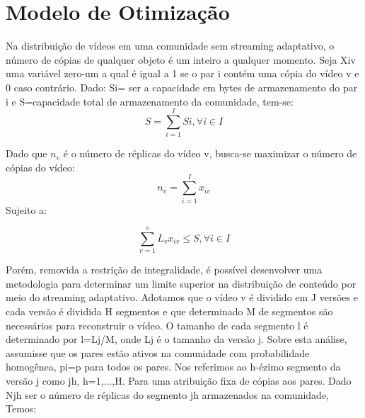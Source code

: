 \documentclass[
	12pt,				%
	oneside,			%
	a4paper,			%
	english,			%
	brazil				%
	]{abntex2ppgsi}
\begin{document}
\section{Modelo de Otimização}

Na distribuição de vídeos em uma comunidade sem streaming adaptativo, o número de cópias de qualquer objeto é um inteiro a qualquer momento. Seja Xiv uma variável zero-um a qual é igual a 1 se o par i contém uma cópia do vídeo v e 0 caso contrário.
Dado: Si= ser a capacidade em bytes de armazenamento do par i e  S=capacidade total de armazenamento da comunidade, tem-se:
\begin{equation}
S=\sum_{i=1}^{I}Si,\forall i\in I
\end{equation}





Dado que $n_v$ é o número de réplicas do vídeo v, busca-se maximizar o número de cópias do vídeo:
\begin{equation}
n_{v}=\sum_{i=1}^{I}x_{iv}
	\label{eq:equacao-exemplo1}
\end{equation}
Sujeito a:

\begin{equation}
  \sum_{v=1}^{v}L_{v}x_{iv}\leq S, \forall i\in I
	\label{eq:equacao-exemplo3}
\end{equation}


Porém, removida a restrição de integralidade, é possível desenvolver uma metodologia para determinar um limite superior na distribuição de conteúdo por meio do streaming adaptativo.
Adotamos que o vídeo v é dividido em J versões e cada versão é dividida H segmentos e que determinado M de segmentos são necessários para reconstruir o vídeo. O tamanho de cada segmento l é determinado por l=Lj/M, onde Lj é o tamanho da versão j.
Sobre esta análise, assumisse que os pares estão ativos na comunidade com probabilidade homogênea, pi=p para todos os pares.
Nos referimos ao h-ézimo segmento da versão j como jh, h=1,...,H. Para uma atribuição fixa de cópias aos pares. Dado Njh ser o número de réplicas do segmento jh armazenados na comunidade, Temos:
\end{document}
